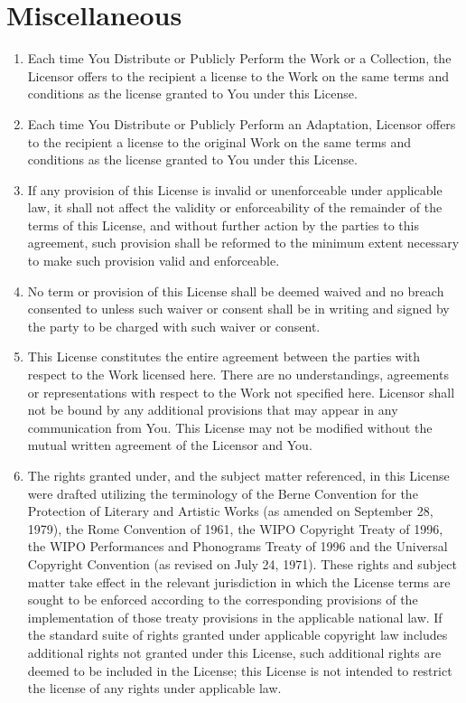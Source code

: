 \documentclass[10pt]{book}
\begin{document}
\section{ Miscellaneous}
\begin{enumerate}
	\item Each time You Distribute or Publicly Perform the Work           or a Collection, the Licensor offers to the recipient a           license to the Work on the same terms and conditions as           the license granted to You under this License.
	\item Each time You Distribute or Publicly Perform an           Adaptation, Licensor offers to the recipient a license to           the original Work on the same terms and conditions as the           license granted to You under this License.
	\item If any provision of this License is invalid or           unenforceable under applicable law, it shall not affect           the validity or enforceability of the remainder of the           terms of this License, and without further action by the           parties to this agreement, such provision shall be           reformed to the minimum extent necessary to make such           provision valid and enforceable.
	\item No term or provision of this License shall be deemed           waived and no breach consented to unless such waiver or           consent shall be in writing and signed by the party to be           charged with such waiver or consent.
	\item This License constitutes the entire agreement between           the parties with respect to the Work licensed here. There           are no understandings, agreements or representations with           respect to the Work not specified here. Licensor shall           not be bound by any additional provisions that may appear           in any communication from You. This License may not be           modified without the mutual written agreement of the           Licensor and You.
	\item The rights granted under, and the subject matter           referenced, in this License were drafted utilizing the           terminology of the Berne Convention for the Protection of           Literary and Artistic Works (as amended on September 28,           1979), the Rome Convention of 1961, the WIPO Copyright           Treaty of 1996, the WIPO Performances and Phonograms           Treaty of 1996 and the Universal Copyright Convention (as           revised on July 24, 1971). These rights and subject           matter take effect in the relevant jurisdiction in which           the License terms are sought to be enforced according to           the corresponding provisions of the implementation of           those treaty provisions in the applicable national law.           If the standard suite of rights granted under applicable           copyright law includes additional rights not granted           under this License, such additional rights are deemed to           be included in the License; this License is not intended           to restrict the license of any rights under applicable           law.
\end{enumerate}
\end{document}
